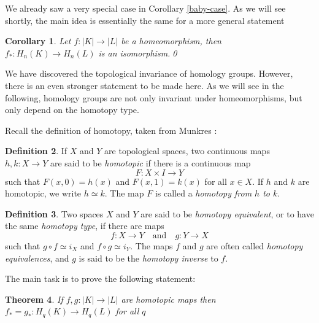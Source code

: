 \documentclass[toc=bib, headinclude]{scrartcl}
\theoremstyle{plain}
\newtheorem{theorem}{Theorem}[section]
\newtheorem{corollary}[theorem]{Corollary}
\theoremstyle{definition}
\newtheorem	{definition}[theorem]{Definition}
\theoremstyle{remark}
\newcommand{\qandq}{\quad \text{and} \quad}
\begin{document}
We already saw a very special case in Corollary \ref{baby-case}. As we will see shortly, the main idea is essentially the same for a more general statement

\begin{corollary}
	Let $f: |K|\to |L| $ be a homeomorphism, then $f_\ast: H_n(K)\to H_n(L)$ is an isomorphism.\qed
\end{corollary}

We have discovered the topological invariance of homology groups. However, there is an even stronger statement to be made here. As we will see in the following, homology groups are not only invariant under homeomorphisms, but only depend on the homotopy type. 

Recall the definition of homotopy, taken from Munkres \cite[p. 94]{mu}:

\begin{definition}
	If $X$ and $Y$ are topological spaces, two continuous maps $h, k: X\to Y$ are said to be \textit{homotopic} if there is a continuous map \[
	F: X\times I\to Y
	\]
	such that $F(x,0)=h(x)$ and $F(x,1)=k(x)$ for all $x\in X$. If $h$ and $k$ are homotopic, we write $h\simeq k$. The map $F$ is called a \textit{homotopy from $h$ to $k$}. 
\end{definition}
\begin{definition}\label{def:hom-eq}
	Two spaces $X$ and $Y$ are said to be \textit{homotopy equivalent}, or to have the same \textit{homotopy type}, if there are maps\[
	f: X\to Y\qandq g:Y\to X
	\]
	such that $g\circ f\simeq i_X$ and $f\circ g\simeq i_Y$. The maps $f$ and $g$ are often called \textit{homotopy equivalences}, and $g$ is said to be the \textit{homotopy inverse} to $f$.
\end{definition}

The main task is to prove the following statement:

\begin{theorem}\label{homotopy_invariance}
	If $f,g:|K|\to |L|$ are homotopic maps then $f_\ast=g_\ast: H_q(K)\to H_q(L)$ for all $q$
\end{theorem}
\end{document}
